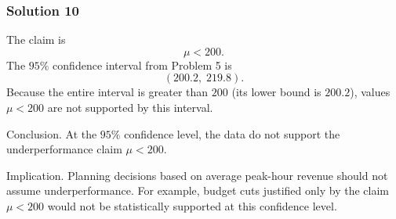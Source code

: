 \subsubsection*{Solution 10}

The claim is
\[
\mu < 200.
\]
The $95\%$ confidence interval from Problem 5 is
\[
(200.2,\;219.8).
\]
Because the entire interval is greater than $200$ (its lower bound is $200.2$), values $\mu < 200$ are not supported by this interval.

Conclusion. At the $95\%$ confidence level, the data do not support the underperformance claim $\mu < 200$.

Implication. Planning decisions based on average peak-hour revenue should not assume underperformance. For example, budget cuts justified only by the claim $\mu < 200$ would not be statistically supported at this confidence level.
